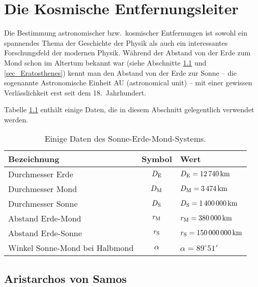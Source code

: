 

\chapter{Die Kosmische Entfernungsleiter}
\label{chap_Kosm_Entfernung}

%
Die Bestimmung astronomischer bzw.\ kosmischer Entfernungen ist sowohl ein
spannendes Thema der Geschichte der Physik als auch ein interessantes
Forschungsfeld der modernen Physik. W\"ahrend der Abstand von der Erde zum
Mond schon im Altertum bekannt war (siehe Abschnitte \ref{sec_Aristarchos} und \ref{sec_Eratosthenes}) 
kennt man den Abstand von der Erde zur Sonne -- die sogenannte Astronomische
Einheit AU (astronomical unit) -- mit einer gewissen Verl\"asslichkeit erst seit dem 18.\ Jahrhundert.

Tabelle \ref{tab_Arist} enth\"alt einige Daten, die in diesem Abschnitt gelegentlich
verwendet werden.%

\begin{table}[htb]
\begin{tabular}{l|c|l}
Bezeichnung & Symbol & Wert \\ \hline
Durchmesser Erde & $D_{\rm E}$ &  $D_{\rm E}= 12\,740\,{\rm km}$ \\
Durchmesser Mond & $D_{\rm M}$ &  $D_{\rm M}= 3\,474\,{\rm km}$ \\
Durchmesser Sonne & $D_{\rm S}$ &  $D_{\rm S}=  1\,400\,000 \,{\rm km}$ \\
Abstand Erde-Mond & $r_{\rm M}$  &  $r_{\rm M} = 380\,000\,{\rm km}$ \\
Abstand Erde-Sonne & $r_{\rm S}$  &  $r_{\rm S} = 150\,000\,000\,{\rm km}$ \\
Winkel Sonne-Mond bei Halbmond & $\alpha$ & $\alpha = 89^\circ 51'$ \\ \hline
\end{tabular}
\caption{\label{tab_Arist}%
Einige Daten des Sonne-Erde-Mond-Systems.}
\end{table}

\section{Aristarchos von Samos}
\label{sec_Aristarchos}

